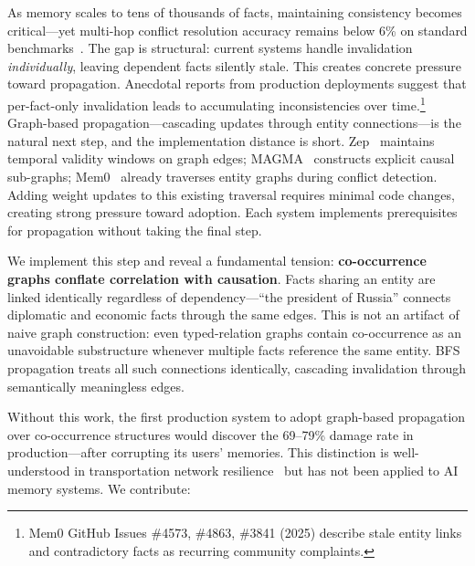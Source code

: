 \documentclass{article}
\begin{document}
As memory scales to tens of thousands of facts, maintaining consistency becomes critical---yet multi-hop conflict resolution accuracy remains below 6\% on standard benchmarks~\citep{memoryagentbench_2026}.
The gap is structural: current systems handle invalidation \textit{individually}, leaving dependent facts silently stale.
This creates concrete pressure toward propagation.
Anecdotal reports from production deployments suggest that per-fact-only invalidation leads to accumulating inconsistencies over time.\footnote{Mem0 GitHub Issues \#4573, \#4863, \#3841 (2025) describe stale entity links and contradictory facts as recurring community complaints.}
Graph-based propagation---cascading updates through entity connections---is the natural next step, and the implementation distance is short.
Zep~\citep{zep_2025} maintains temporal validity windows on graph edges; MAGMA~\citep{magma_2026} constructs explicit causal sub-graphs; Mem0~\citep{mem0_2024} already traverses entity graphs during conflict detection.
Adding weight updates to this existing traversal requires minimal code changes, creating strong pressure toward adoption.
Each system implements prerequisites for propagation without taking the final step.

We implement this step and reveal a fundamental tension: \textbf{co-occurrence graphs conflate correlation with causation}.
Facts sharing an entity are linked identically regardless of dependency---``the president of Russia'' connects diplomatic and economic facts through the same edges.
This is not an artifact of naive graph construction: even typed-relation graphs contain co-occurrence as an unavoidable substructure whenever multiple facts reference the same entity.
BFS propagation treats all such connections identically, cascading invalidation through semantically meaningless edges.

Without this work, the first production system to adopt graph-based propagation over co-occurrence structures would discover the 69--79\% damage rate in production---after corrupting its users' memories.
This distinction is well-understood in transportation network resilience~\citep{chen_network_2007} but has not been applied to AI memory systems.
We contribute:
\end{document}
